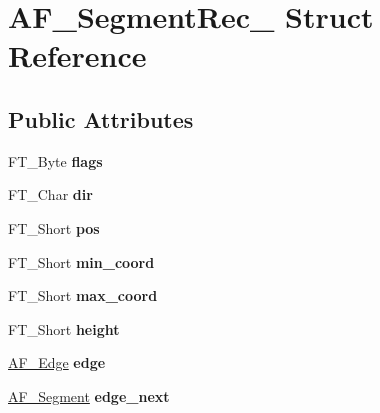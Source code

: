 \hypertarget{struct_a_f___segment_rec__}{}\section{A\+F\+\_\+\+Segment\+Rec\+\_\+ Struct Reference}
\label{struct_a_f___segment_rec__}
\subsection*{Public Attributes}
\begin{DoxyCompactItemize}
\item 
\mbox{\label{struct_a_f___segment_rec___a06c2fb24257b1ac68ee3e4e705838d67}} 
F\+T\+\_\+\+Byte {\bfseries flags}
\item 
\mbox{\label{struct_a_f___segment_rec___a1f224feb1e9cc92b368f2bdf6cf2d2fb}} 
F\+T\+\_\+\+Char {\bfseries dir}
\item 
\mbox{\label{struct_a_f___segment_rec___ac9fc981f4e37658ec98757f45673f1f0}} 
F\+T\+\_\+\+Short {\bfseries pos}
\item 
\mbox{\label{struct_a_f___segment_rec___a25de1ec9f40e6bae9aa268a9425db490}} 
F\+T\+\_\+\+Short {\bfseries min\+\_\+coord}
\item 
\mbox{\label{struct_a_f___segment_rec___a2c87699e923b2e510ad6367e94f72e7a}} 
F\+T\+\_\+\+Short {\bfseries max\+\_\+coord}
\item 
\mbox{\label{struct_a_f___segment_rec___a4e07a82754c81f9525bec21d950bbeaa}} 
F\+T\+\_\+\+Short {\bfseries height}
\item 
\mbox{\label{struct_a_f___segment_rec___ae7725abe2fb5d3da8123edc8579124bf}} 
\hyperlink{struct_a_f___edge_rec__}{A\+F\+\_\+\+Edge} {\bfseries edge}
\item 
\mbox{\label{struct_a_f___segment_rec___a68786aed948ad02e736927b29413b77f}} 
\hyperlink{struct_a_f___segment_rec__}{A\+F\+\_\+\+Segment} {\bfseries edge\+\_\+next}
\item 

\end{DoxyCompactItemize}
